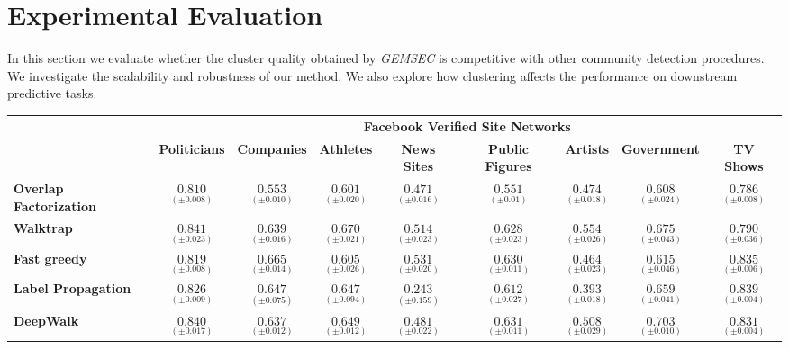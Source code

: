  \section{Experimental Evaluation}\label{sec:experiments}
In this section we evaluate whether the cluster quality obtained by \textit{GEMSEC} is competitive with other community detection procedures. We investigate the scalability and robustness of our method. We also explore how clustering affects the performance on downstream predictive tasks.{\small\begin{table*}
\centering
\begin{tabular}{lcccccccc}

&\multicolumn{8}{c}{\textbf{Facebook Verified Site Networks}} \\
\cline{2-9}
  & \textbf{Politicians} & \textbf{Companies} & \textbf{Athletes}   & \textbf{News Sites}   & \textbf{Public Figures} & \textbf{Artists}& \textbf{Government}& \textbf{TV Shows}   \\
\hline
\textbf{Overlap Factorization}            &$\underset{ (\pm 0.008)}{0.810}$&$\underset{( \pm 0.010)}{0.553}$
&$\underset{( \pm 0.020)}{0.601}$&$\underset{( \pm 0.016)}{0.471}$&$\underset{( \pm 0.01)}{0.551}$ &$\underset{(\pm 0.018)}{0.474}$&$\underset{( \pm 0.024)}{0.608}$ &$\underset{( \pm 0.008)}{0.786}$ \\[0.3em]
\textbf{Walktrap}            &$\underset{(\pm 0.023)}{0.841}$&$\underset{(\pm 0.016)}{0.639}$&$\underset{(\pm 0.021)}{0.670}$&$\underset{(\pm 0.023)}{0.514}$&$\underset{(\pm 0.023)}{0.628}$ &$\underset{(\pm 0.026)}{0.554}$&$\underset{(\pm 0.043)}{0.675}$ &$\underset{(\pm 0.036)}{0.790}$ \\[0.3em]
\textbf{Fast greedy}     &$\underset{(\pm 0.008)}{0.819}$& $\underset{(\pm 0.014)}{0.665}$ & $\underset{(\pm 0.026)}{0.605}$ &$\underset{(\pm 0.020)}{0.531}$ &$\underset{(\pm 0.011)}{0.630}$ & $\underset{(\pm 0.023)}{0.464}$&$\underset{(\pm 0.046)}{0.615}$&$\underset{(\pm 0.006)}{0.835}$\\[0.3em]
\textbf{Label Propagation} &$\underset{(\pm 0.009)}{0.826}$   & $\underset{(\pm 0.075)}{0.647}$& $\underset{(\pm 0.094)}{0.647}$      & $\underset{(\pm 0.159)}{0.243}$     &$\underset{(\pm 0.027 )}{0.612}$     & $\underset{(\pm 0.018)}{0.393}$  &$\underset{(\pm 0.041)}{0.659}$& $\underset{(\pm 0.004)}{0.839}$  \\[0.3em]\hline
\textbf{DeepWalk}&$\underset{(\pm 0.017)}{0.840}$&$\underset{(\pm 0.012)}{0.637}$&$\underset{(\pm 0.012)}{0.649}$&$\underset{(\pm 0.022)}{0.481}$&$\underset{(\pm 0.011)}{0.631}$&$\underset{(\pm 0.029)}{0.508}$&$\underset{(\pm 0.010)}{0.703}$&$\underset{(\pm 0.004)}{0.831}$

\end{tabular}
\end{table*}}
